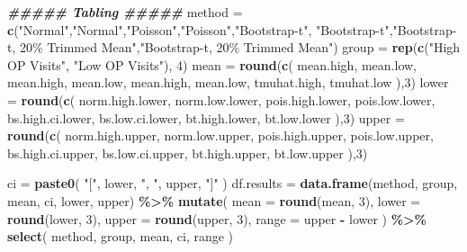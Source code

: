 \documentclass[
]{article}
\newenvironment{Shaded}{\begin{snugshade}}{\end{snugshade}}
\newcommand{\AttributeTok}[1]{\textcolor[rgb]{0.13,0.29,0.53}{#1}}
\newcommand{\DecValTok}[1]{\textcolor[rgb]{0.00,0.00,0.81}{#1}}
\newcommand{\DocumentationTok}[1]{\textcolor[rgb]{0.56,0.35,0.01}{\textbf{\textit{#1}}}}
\newcommand{\FunctionTok}[1]{\textcolor[rgb]{0.13,0.29,0.53}{\textbf{#1}}}
\newcommand{\NormalTok}[1]{#1}
\newcommand{\OtherTok}[1]{\textcolor[rgb]{0.56,0.35,0.01}{#1}}
\newcommand{\SpecialCharTok}[1]{\textcolor[rgb]{0.81,0.36,0.00}{\textbf{#1}}}
\newcommand{\StringTok}[1]{\textcolor[rgb]{0.31,0.60,0.02}{#1}}
\begin{document}
\begin{Shaded}
\begin{Highlighting}[]
\DocumentationTok{\#\#\#\#\# Tabling \#\#\#\#\#}
\NormalTok{method }\OtherTok{=} \FunctionTok{c}\NormalTok{(}\StringTok{"Normal"}\NormalTok{,}\StringTok{"Normal"}\NormalTok{,}\StringTok{"Poisson"}\NormalTok{,}\StringTok{"Poisson"}\NormalTok{,}\StringTok{"Bootstrap{-}t"}\NormalTok{, }\StringTok{"Bootstrap{-}t"}\NormalTok{,}\StringTok{"Bootstrap{-}t, 20\% Trimmed Mean"}\NormalTok{,}\StringTok{"Bootstrap{-}t, 20\% Trimmed Mean"}\NormalTok{)}
\NormalTok{group }\OtherTok{=} \FunctionTok{rep}\NormalTok{(}\FunctionTok{c}\NormalTok{(}\StringTok{"High OP Visits"}\NormalTok{, }\StringTok{"Low OP Visits"}\NormalTok{), }\DecValTok{4}\NormalTok{)}
\NormalTok{mean }\OtherTok{=} \FunctionTok{round}\NormalTok{(}\FunctionTok{c}\NormalTok{(}
\NormalTok{    mean.high, mean.low,}
\NormalTok{    mean.high, mean.low,}
\NormalTok{    mean.high, mean.low,}
\NormalTok{    tmuhat.high, tmuhat.low}
\NormalTok{    ),}\DecValTok{3}\NormalTok{)}
\NormalTok{lower }\OtherTok{=} \FunctionTok{round}\NormalTok{(}\FunctionTok{c}\NormalTok{(}
\NormalTok{    norm.high.lower, norm.low.lower,}
\NormalTok{    pois.high.lower, pois.low.lower,}
\NormalTok{    bs.high.ci.lower, bs.low.ci.lower,}
\NormalTok{    bt.high.lower, bt.low.lower}
\NormalTok{    ),}\DecValTok{3}\NormalTok{)}
\NormalTok{upper }\OtherTok{=} \FunctionTok{round}\NormalTok{(}\FunctionTok{c}\NormalTok{(}
\NormalTok{    norm.high.upper, norm.low.upper,}
\NormalTok{    pois.high.upper, pois.low.upper,}
\NormalTok{    bs.high.ci.upper, bs.low.ci.upper,}
\NormalTok{    bt.high.upper, bt.low.upper}
\NormalTok{    ),}\DecValTok{3}\NormalTok{)}

\NormalTok{ci }\OtherTok{=} \FunctionTok{paste0}\NormalTok{(}
    \StringTok{"["}\NormalTok{,}
\NormalTok{    lower,}
    \StringTok{", "}\NormalTok{,}
\NormalTok{    upper,}
    \StringTok{"]"}
\NormalTok{)}
\NormalTok{df.results }\OtherTok{=} \FunctionTok{data.frame}\NormalTok{(method, group, mean, ci, lower, upper) }\SpecialCharTok{\%\textgreater{}\%}
    \FunctionTok{mutate}\NormalTok{(}
        \AttributeTok{mean =} \FunctionTok{round}\NormalTok{(mean, }\DecValTok{3}\NormalTok{),}
        \AttributeTok{lower =} \FunctionTok{round}\NormalTok{(lower, }\DecValTok{3}\NormalTok{),}
        \AttributeTok{upper =} \FunctionTok{round}\NormalTok{(upper, }\DecValTok{3}\NormalTok{),}
        \AttributeTok{range =}\NormalTok{ upper }\SpecialCharTok{{-}}\NormalTok{ lower}
\NormalTok{    ) }\SpecialCharTok{\%\textgreater{}\%}
    \FunctionTok{select}\NormalTok{(}
\NormalTok{        method,}
\NormalTok{        group,}
\NormalTok{        mean,}
\NormalTok{        ci,}
\NormalTok{        range}
\NormalTok{    )}


\end{Highlighting}
\end{Shaded}
\end{document}
